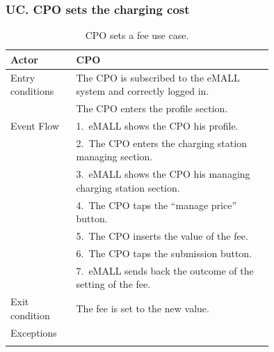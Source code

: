 \subsubsection*{UC\cuc . CPO sets the charging cost}
\begin{center}
    \begin{longtable}{lp{0.75\linewidth}}
        \hline
        Actor            & CPO                                                                \\
        \hline
        Entry conditions & The CPO is subscribed to the eMALL system and correctly logged in. \\
        & The CPO enters the profile section.                                \\
        \hline
        Event Flow       & 1.\ eMALL shows the CPO his profile.                               \\
        & 2.\ The CPO enters the charging station managing section.          \\
        & 3.\ eMALL shows the CPO his managing charging station section.     \\
        & 4.\ The CPO taps the ``manage price'' button.                      \\
        & 5.\ The CPO inserts the value of the fee.                          \\
        & 6.\ The CPO taps the submission button.                            \\
        & 7.\ eMALL sends back the outcome of the setting of the fee.        \\
        \hline
        Exit condition   & The fee is set to the new value.                                   \\
        \hline
        Exceptions       &                                                                    \\
        \hline
        \caption{CPO sets a fee use case.}
        \label{tab: CPO_sets_fee_use_case}
    \end{longtable}


\end{center}
